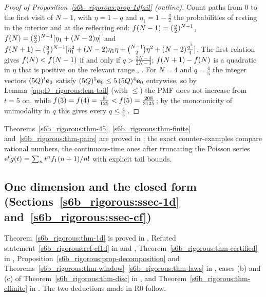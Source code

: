 \begin{proof}[Proof of Proposition~\ref{s6b_rigorous:prop-1dfail} (outline)]
Count paths from $0$ to the first visit of $N-1$, with $\eta=1-q$ and $\eta_1=1-\frac q2$ the probabilities of resting
in the interior and at the reflecting end: $f(N-1)=(\frac q2)^{N-1}$,
$f(N)=(\frac q2)^{N-1}[\eta_1+(N-2)\eta]$ and
$f(N+1)=(\frac q2)^{N-1}[\eta_1^{2}+(N-2)\eta_1\eta+\binom{N-1}{2}\eta^{2}+(N-2)\frac{q^{2}}{4}]$. The first relation
gives $f(N)<f(N-1)$ if and only if $q>\frac{2N-4}{2N-3}$; $f(N+1)-f(N)$ is a quadratic in $\eta$ that is
positive on the relevant range , . For $N=4$ and $q=\frac45$ the integer vectors
$(5Q)^{t}\mathbf{e}_0$ satisfy $(5Q)^{5}\mathbf{e}_0\le5\,(5Q)^{4}\mathbf{e}_0$ entrywise, so by Lemma~\ref{appD_rigorous:lem-tail}
(with $\le$) the PMF does not increase from $t=5$ on, while $f(3)=f(4)=\frac8{125}<f(5)=\frac{208}{3125}$; by
the monotonicity of unimodality in $q$  this gives every $q\le\frac45$ .
\end{proof}

Theorems~\ref{s6b_rigorous:thm-45}, \ref{s6b_rigorous:thm-finite} and~\ref{s6b_rigorous:thm-pairs} are proved in
; the exact counter-examples compare rational numbers, the continuous-time ones after
truncating the Poisson series $\mathrm{e}^{t}g(t)=\sum_nt^{n}f_1(n+1)/n!$ with explicit tail bounds.

\subsection{One dimension and the closed form (Sections~\ref{s6b_rigorous:ssec-1d} and~\ref{s6b_rigorous:ssec-cf})}

Theorem~\ref{s6b_rigorous:thm-1d} is proved in , Refuted
statement~\ref{s6b_rigorous:ref-cf1d} in  and ,
Theorem~\ref{s6b_rigorous:thm-certified} in , Proposition~\ref{s6b_rigorous:prop-decomposition}
and Theorems~\ref{s6b_rigorous:thm-window}--\ref{s6b_rigorous:thm-laws} in , cases (b) and (c)
of Theorem~\ref{s6b_rigorous:thm-disc} in , and Theorem~\ref{s6b_rigorous:thm-cffinite} in
. The two deductions made in R0 follow.


